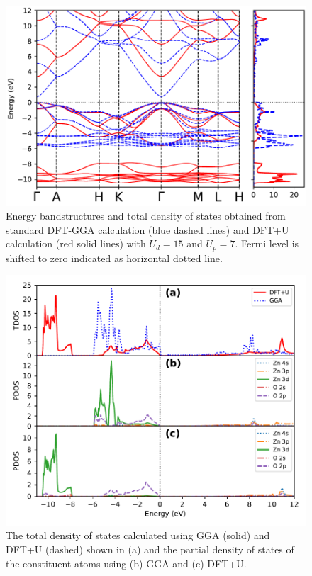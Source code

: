\begin{figure}[tbh!]
	\centering
	\includegraphics[width=0.7\linewidth]{"images/rnd/band-dos_juxtapose"}
	\caption[Energy bandstructures and total density of states obtained from standard DFT-GGA calculation (blue dashed lines) and DFT+U calculation (red solid lines)with $U_d =15$ and $U_p= 7$]{Energy bandstructures and total density of states obtained from standard DFT-GGA calculation (blue dashed lines) and DFT+U calculation (red solid lines) with $U_d =15$ and $U_p= 7$. Fermi level is shifted to zero indicated as horizontal dotted line. }
	\label{fig:hubbard_band-dos}
\end{figure}


\begin{figure}[tbh!]
	\centering
	\includegraphics[width=0.7\linewidth]{"images/rnd/dos-pdos_juxtapose"}
	\caption[The total density of states calculated using GGA (solid) and DFT+U (dashed) shown in (a) and the partial density of states of the constituent atoms using (b) GGA and (c) DFT+U]{ The total density of states calculated using GGA (solid) and DFT+U (dashed) shown in (a) and the partial density of states of the constituent atoms using (b) GGA and (c) DFT+U.}
	\label{fig:hubbard_pdos}
\end{figure}

